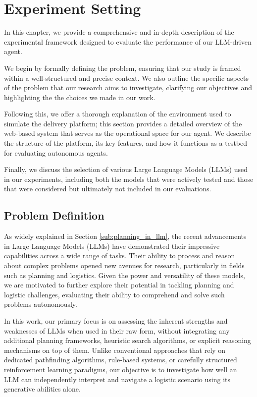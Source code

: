\chapter{Experiment Setting}
\label{cha:experiment_setting}

In this chapter, we provide a comprehensive and in-depth description of the experimental
framework designed to evaluate the performance of our LLM-driven agent.

We begin by formally defining the problem, ensuring that our study is framed
within a well-structured and precise context. We also outline the specific aspects
of the problem that our research aims to investigate, clarifying our objectives
and highlighting the the choices we made in our work.

Following this, we offer a thorough explanation of the environment used to simulate
the delivery platform; this section provides a detailed overview of the web-based
system that serves as the operational space for our agent. We describe the structure
of the platform, its key features, and how it functions as a testbed for evaluating
autonomous agents.

Finally, we discuss the selection of various Large Language Models (LLMs) used
in our experiments, including both the models that were actively tested and those
that were considered but ultimately not included in our evaluations.

\section{Problem Definition}
\label{sec:problem_definition}

As widely explained in Section \ref{sub:planning_in_llm}, the recent advancements
in Large Language Models (LLMs) have demonstrated their impressive capabilities across
a wide range of tasks. Their ability to process and reason about complex
problems opened new avenues for research, particularly in fields such as planning
and logistics. Given the power and versatility of these models, we are motivated
to further explore their potential in tackling planning and logistic challenges,
evaluating their ability to comprehend and solve such problems autonomously.

In this work, our primary focus is on assessing the inherent strengths and weaknesses
of LLMs when used in their raw form, without integrating any additional planning
frameworks, heuristic search algorithms, or explicit reasoning mechanisms on top
of them. Unlike conventional approaches that rely on dedicated pathfinding algorithms,
rule-based systems, or carefully structured reinforcement learning paradigms,
our objective is to investigate how well an LLM can independently interpret and
navigate a logistic scenario using its generative abilities alone.

